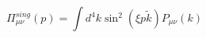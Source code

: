 \begin{equation}   
\Pi_{\mu \nu}^{sing}(p)= \int d^4k \sin^2(\xi p \tilde{k})P_{\mu 
\nu}(k)
 \label{20} \end{equation} 
